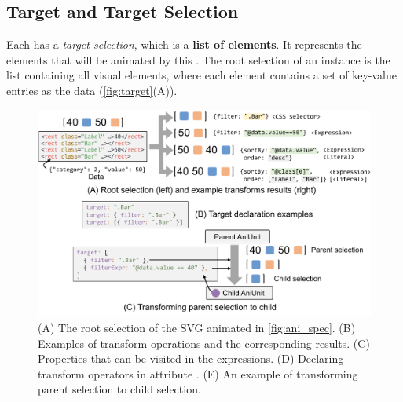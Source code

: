 \subsection{Target and Target Selection}
\label{ssec:gaia_ani_target}


Each \aniunit{} has a \textit{target selection}, which is a \textbf{list of elements}.
It represents the elements that will be animated by this \aniunit{}.
The root selection of an instance is the list containing all visual elements, where each element contains a set of key-value entries as the data (\autoref{fig:target}(A)).

\begin{figure}[h]
  \centering
  \includegraphics[width=\linewidth]{figs/transform.pdf}
  \caption{
  (A) The root selection of the SVG animated in \autoref{fig:ani_spec}. 
  (B) Examples of transform operations and the corresponding results.
  (C) Properties that can be visited in the expressions.
  (D) Declaring transform operators in attribute .
  (E) An example of transforming parent selection to child selection.
  }
  \label{fig:target}
\end{figure}


